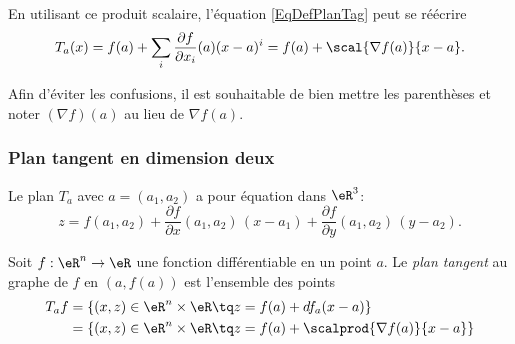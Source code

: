 En utilisant ce produit scalaire, l'équation \eqref{EqDefPlanTag} peut se réécrire
\begin{equation}
	T_a(x)=f(a)+\sum_i\frac{ \partial f }{ \partial x_i }(a)(x-a)^i=f(a)+\scal{\nabla f(a)}{x-a}.
\end{equation}

Afin d'éviter les confusions, il est souhaitable de bien mettre les parenthèses et noter \( (\nabla f)(a)\) au lieu de \( \nabla f(a)\).


\subsubsection{Plan tangent en dimension deux}

Le plan \( T_a\) avec \( a=(a_1,a_2)\) a pour équation dans \( \eR^3\):
\begin{equation}        \label{EqPlanTgEnDimDeux}
	z = f(a_1,a_2) + \frac{\partial f}{\partial x}(a_1,a_2)\,(x-a_1)+ \frac{\partial f}{\partial y}(a_1,a_2)\,(y-a_2).
\end{equation}

\begin{definition}
	Soit \( f : \eR^n \to\eR\) une fonction différentiable en un point
	\( a\). Le \emph{plan tangent} au graphe de \( f\) en \( (a,f(a))\) est
	l'ensemble des points
	\begin{equation*}
		\begin{split}
			T_af &= \{ (x,z) \in \eR^n \times \eR \tq z = f(a) + d f_a (x-a)\}\\
			&= \{ (x,z) \in \eR^n \times \eR \tq z = f(a) + \scalprod{\nabla f(a)}{x-a}\}
		\end{split}
	\end{equation*}
\end{definition}


